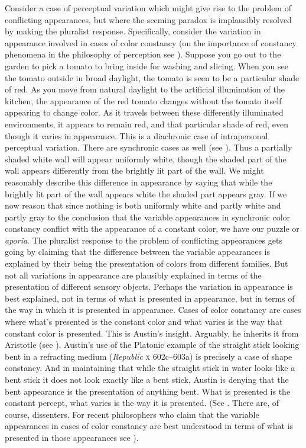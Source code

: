 \documentclass[12pt]{article}
\begin{document}
Consider a case of perceptual variation which might give rise to the problem of conflicting appearances, but where the seeming paradox is implausibly resolved by making the pluralist response. Specifically, consider the variation in appearance involved in cases of color constancy (on the importance of constancy phenomena in the philosophy of perception see \citealt{smith02,Burge:2010uq}). Suppose you go out to the garden to pick a tomato to bring inside for washing and slicing. When you see the tomato outside in broad daylight, the tomato is seen to be a particular shade of red. As you move from natural daylight to the artificial illumination of the kitchen, the appearance of the red tomato changes without the tomato itself appearing to change color. As it travels between these differently illuminated environments, it appears to remain red, and that particular shade of red, even though it varies in appearance. This is a diachronic case of intrapersonal perceptual variation. There are synchronic cases as well (see \citealt{Arend:1986aa,Cohen:2008hc}). Thus a partially shaded white wall will appear uniformly white, though the shaded part of the wall appears differently from the brightly lit part of the wall. We might reasonably describe this difference in appearance by saying that while the brightly lit part of the wall appears white the shaded part appears gray. If we now reason that since nothing is both uniformly white and partly white and partly gray to the conclusion that the variable appearances in synchronic color constancy conflict with the appearance of a constant color, we have our puzzle or \emph{aporia}. The pluralist response to the problem of conflicting appearances gets going by claiming that the difference between the variable appearances is explained by their being the presentation of colors from different families. But not all variations in appearance are plausibly explained in terms of the presentation of different sensory objects. Perhaps the variation in appearance is best explained, not in terms of what is presented in appearance, but in terms of the way in which it is presented in appearance. Cases of color constancy are cases where what's presented is the constant color and what varies is the way that constant color is presented. This is Austin's \citeyearpar{Austin:1962lr} insight. Arguably, he inherits it from Aristotle (see \citealt{Kalderon:2015fr}). Austin's use of the Platonic example of the straight stick looking bent in a refracting medium (\emph{Republic} \textsc{x} 602c--603a) is precisely a case of shape constancy. And in maintaining that while the straight stick in water looks like a bent stick it does not look exactly like a bent stick, Austin is denying that the bent appearance is the presentation of anything bent. What is presented is the constant percept, what varies is the way it is presented. (See \citealt{Chisholm:1957dq,Kalderon:2010fj}. There are, of course, dissenters. For recent philosophers who claim that the variable appearances in cases of color constancy are best understood in terms of what is presented in those appearances see \citealt{Noe:2004fk,Chalmers:2006kx}).
\end{document}
